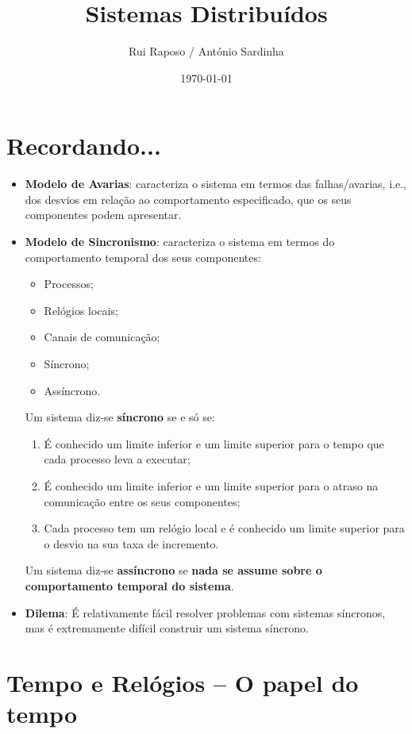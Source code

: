 \documentclass{article}
\date{\today \\ \currenttime}
\title{Sistemas Distribuídos}
\author{Rui Raposo / António Sardinha}
\begin{document}
\maketitle

\section{Recordando...}

\begin{itemize}
	\item \textbf{Modelo de Avarias}: caracteriza o sistema em termos das falhas/avarias, i.e., dos desvios em relação ao comportamento especificado, que os seus componentes podem apresentar.
	\item \textbf{Modelo de Sincronismo}: caracteriza o sistema em termos do comportamento temporal dos seus componentes:
		\begin{itemize}
			\item Processos;
			\item Relógios locais;
			\item Canais de comunicação;
			\item Síncrono;
			\item Assíncrono.
		\end{itemize}
		Um sistema diz-se \textbf{síncrono} se e só se:
		\begin{enumerate}
			\item É conhecido um limite inferior e um limite superior para o tempo que cada processo leva a executar;
			\item É conhecido um limite inferior e um limite superior para o atraso na comunicação entre os seus componentes;
			\item Cada processo tem um relógio local e é conhecido um limite superior para o desvio na sua taxa de incremento.
		\end{enumerate}
		Um sistema diz-se \textbf{assíncrono} se \textbf{nada se assume sobre o comportamento temporal do sistema}.
		\item \textbf{Dilema}: É relativamente fácil resolver problemas com sistemas síncronos, mas é extremamente difícil construir um sistema síncrono.
\end{itemize}

\section{Tempo e Relógios -- O papel do tempo}
\end{document}
